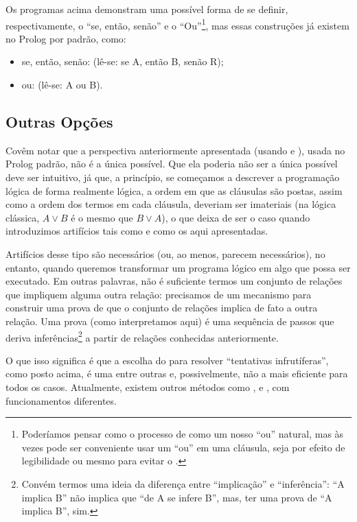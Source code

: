 \documentclass{article}
\begin{document}
Os programas acima demonstram uma possível forma de se definir,
respectivamente, o ``se, então, senão'' e o ``Ou''\footnote{Poderíamos pensar como o processo de
   como um nosso ``ou'' natural, mas às vezes
  pode ser conveniente usar um ``ou'' em uma cláusula, seja por efeito
  de legibilidade ou mesmo para evitar o .}, mas
essas construções já existem no Prolog por padrão, como:

\begin{itemize}
  \item se, então, senão:  (lê-se: se A, então
    B, senão R);
  \item ou:  (lê-se: A ou B).
\end{itemize}


\subsection{Outras Opções}

Covêm notar que a perspectiva anteriormente apresentada (usando
 e ), usada no
Prolog padrão, não é a única possível. Que ela poderia não ser a
única possível deve ser intuitivo, já que, a princípio, se começamos a
descrever a programação lógica de forma realmente lógica, a ordem em
que as cláusulas são postas, assim como a ordem dos termos em cada
cláusula, deveriam ser imateriais (na lógica clássica, $A \vee B$ é o
mesmo que $B \vee A$), o que deixa de ser o caso quando introduzimos
artifícios tais como  e
 como os aqui apresentadas.

Artifícios desse tipo são necessários (ou, ao menos, parecem
necessários), no entanto, quando queremos transformar um programa
lógico em algo que possa ser executado. Em outras palavras, não é
suficiente termos um conjunto de relações que impliquem alguma outra
relação: precisamos de um mecanismo para construir uma prova de que o
conjunto de relações implica de fato a outra relação.  Uma prova (como
interpretamos aqui) é uma sequência de passos que deriva
inferências\footnote{Convém termos uma ideia da diferença entre
  ``implicação'' e ``inferência'': ``A implica B'' não implica que
  ``de A se infere B'', mas, ter uma prova de ``A implica B'', sim.} a
partir de relações conhecidas anteriormente.

O que isso significa é que a escolha do  para
resolver ``tentativas infrutíferas'', como posto acima, é uma entre
outras e, possivelmente, não a mais eficiente para todos os
casos. Atualmente, existem outros métodos como ,  e
, com funcionamentos diferentes.
\end{document}
